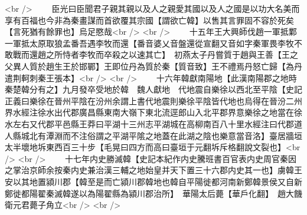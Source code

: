 <br />
　　臣光曰臣聞君子親其親以及人之親愛其國以及人之國是以功大名美而享有百福也今非為秦畫謀而首欲覆其宗國【謂欲亡韓】以售其言罪固不容於死矣【言死猶有餘罪也】烏足愍哉<br />
<br />
　　十五年王大興師伐趙一軍抵鄴一軍抵太原取狼孟番吾遇李牧而還【番音婆乂音盤還從宣翻又音如字秦軍畏李牧不敢戰而還趙之所恃者李牧而卒殺之以速其亡】　初燕太子丹嘗質于趙與王善【王之父異人質於趙生王於邯鄲】王即位丹為質於秦【質音致】王不禮焉丹怒亡歸【為丹遣荆軻刺秦王張本】<br />
<br />
　　十六年韓獻南陽地【此漢南陽郡之地時秦楚韓分有之】九月發卒受地於韓　魏人獻地　代地震自樂徐以西北至平陰【史記正義曰樂徐在晉州平陰在汾州余謂上書代地震則樂徐平陰皆代地也烏得在晉汾二州界水經注徐水出代郡廣昌縣東南大嶺下東北流逕郎山入北平郡界意樂徐之地當在徐水左右又代郡平邑縣王莽曰平湖十三州志平湖城在高柳南百八十里水經注曰代郡道人縣城北有潭淵而不注俗謂之平湖平隂之地蓋在此湖之陰也樂意當音洛】臺居牆垣太半壞地坼東西百三十步【毛晃曰四方而高曰臺垣于元翻坼斥格翻說文裂也】<br />
<br />
　　十七年内史勝滅韓【史記本紀作内史騰班書百官表内史周官秦因之掌治京師余按秦内史兼治漢三輔之地始皇并天下置三十六郡内史其一也】虜韓王安以其地置潁川郡【韓至是而亡潁川郡韓地也韓自平陽徙都河南新鄭韓景侯又自新鄭徙都陽翟秦滅韓遂以為陽翟縣為潁川郡治所】　華陽太后薨【華戶化翻】　趙大饑　衛元君薨子角立<br />
<br />

